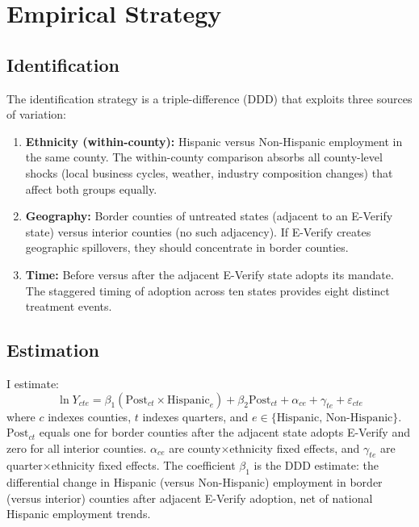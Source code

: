 \documentclass[12pt]{article}
\begin{document}
\section{Empirical Strategy}

\subsection{Identification}

The identification strategy is a triple-difference (DDD) that exploits three sources of variation:

\begin{enumerate}
\item \textbf{Ethnicity (within-county):} Hispanic versus Non-Hispanic employment in the same county. The within-county comparison absorbs all county-level shocks (local business cycles, weather, industry composition changes) that affect both groups equally.

\item \textbf{Geography:} Border counties of untreated states (adjacent to an E-Verify state) versus interior counties (no such adjacency). If E-Verify creates geographic spillovers, they should concentrate in border counties.

\item \textbf{Time:} Before versus after the adjacent E-Verify state adopts its mandate. The staggered timing of adoption across ten states provides eight distinct treatment events.
\end{enumerate}

\subsection{Estimation}

I estimate:
\begin{equation}
\ln Y_{cte} = \beta_1 (\text{Post}_{ct} \times \text{Hispanic}_e) + \beta_2 \text{Post}_{ct} + \alpha_{ce} + \gamma_{te} + \varepsilon_{cte}
\label{eq:ddd}
\end{equation}
where $c$ indexes counties, $t$ indexes quarters, and $e \in \{\text{Hispanic, Non-Hispanic}\}$. $\text{Post}_{ct}$ equals one for border counties after the adjacent state adopts E-Verify and zero for all interior counties. $\alpha_{ce}$ are county$\times$ethnicity fixed effects, and $\gamma_{te}$ are quarter$\times$ethnicity fixed effects. The coefficient $\beta_1$ is the DDD estimate: the differential change in Hispanic (versus Non-Hispanic) employment in border (versus interior) counties after adjacent E-Verify adoption, net of national Hispanic employment trends.
\end{document}
